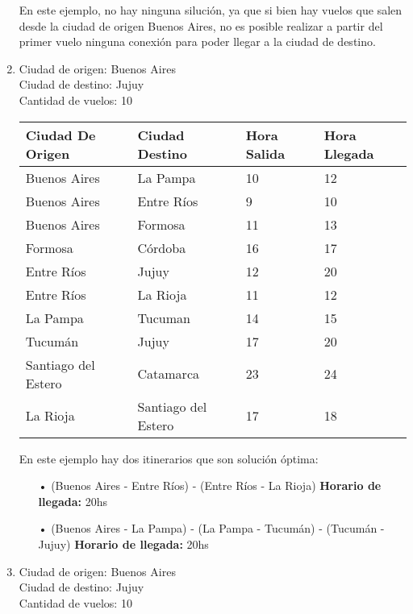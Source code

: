 \begin{enumerate}
En este ejemplo, no hay ninguna silución, ya que si bien hay vuelos que salen desde la ciudad de origen Buenos Aires, no es posible realizar a partir del primer vuelo ninguna conexión para poder llegar a la ciudad de destino.\\


\item
Ciudad de origen: Buenos Aires\\
Ciudad de destino: Jujuy\\
Cantidad de vuelos: 10\\

\begin{center}
	\begin{tabular}{| l | l | l | l |}
	\hline
	Ciudad De Origen & Ciudad Destino & Hora Salida & Hora Llegada\\ \hline
	Buenos Aires & La Pampa & 10 &	12\\
	Buenos Aires & Entre Ríos & 9 & 10 \\
	Buenos Aires & Formosa	&	11	& 13\\
	Formosa	& Córdoba	& 16 & 17  \\
	Entre Ríos & Jujuy	& 12 & 20\\
	Entre Ríos & La Rioja	&	11 & 12\\
	La Pampa & Tucuman	&	14 & 15\\
	Tucumán & Jujuy &	17 & 20\\
	Santiago del Estero	& Catamarca & 23 & 24\\
	La Rioja & Santiago del Estero & 17&18\\
	\hline
	\end{tabular}
\end{center}
\newpage

En este ejemplo hay dos itinerarios que son solución óptima:

\begin{itemize}
\item[•] (Buenos Aires - Entre Ríos) - (Entre Ríos - La Rioja) \textbf{Horario de llegada: } 20hs

\item[•] (Buenos Aires - La Pampa) - (La Pampa - Tucumán) - (Tucumán - Jujuy) \textbf{Horario de llegada: } 20hs\\
\end{itemize}


\item
Ciudad de origen: Buenos Aires\\
Ciudad de destino: Jujuy\\
Cantidad de vuelos: 10\\


\end{enumerate}
